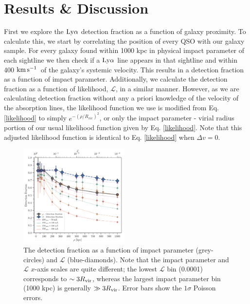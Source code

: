 \documentclass[twocolumn,tighten]{aastex62}
\newcommand{\kms}{$\rm km\, s^{-1}$}
\begin{document}




\section{Results \& Discussion}

First we explore the $\rm Ly\alpha$ detection fraction as a function of galaxy proximity. To calculate this, we start by correlating the position of every QSO with our galaxy sample. For every galaxy found within 1000 kpc in physical impact parameter of each sightline we then check if a $\rm Ly\alpha$ line appears in that sightline and within 400 \kms~of the galaxy's systemic velocity. This results in a detection fraction as a function of impact parameter. Additionally, we calculate the detection fraction as a function of likelihood, $\mathcal{L}$, in a similar manner. However, as we are calculating detection fraction without any a priori knowledge of the velocity of the absorption lines, the likelihood function we use is modified from Eq. \ref{likelihood} to simply $e^{-(\rho/R_{vir})^2}$, or only the impact parameter - virial radius portion of our usual likelihood function given by Eq. \ref{likelihood}. Note that this adjusted likelihood function is identical to Eq. \ref{likelihood} when $\Delta v = 0$. 

\begin{figure}[t!]
        \centering
        \vspace{0pt}
        \includegraphics[width=0.49\textwidth]{detection_fraction_min50_100_200_300_both.pdf}
        \caption{\small{The detection fraction as a function of impact parameter (grey-circles) and $\mathcal{L}$ (blue-diamonds). Note that the impact parameter and $\mathcal{L}$ $x$-axis scales are quite different; the lowest $\mathcal{L}$ bin (0.0001) corresponds to $\sim 3 R_{\rm vir}$, whereas the largest impact parameter bin (1000 kpc) is generally $\gg 3 R_{\rm vir}$. Error bars show the $1\sigma$ Poisson errors.}}
        \vspace{5pt}
        \label{detection_fraction}
\end{figure}
\end{document}
